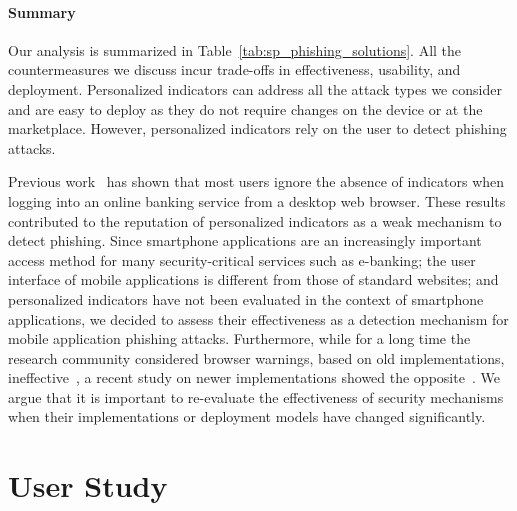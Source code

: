 \paragraph{Summary} Our analysis is summarized in Table~\ref{tab:sp_phishing_solutions}.
All the countermeasures we discuss incur trade-offs in effectiveness,
usability, and deployment. Personalized indicators can address all the attack
types we consider and are easy to deploy as they do not require changes on the
device or at the marketplace. However, personalized indicators rely on the
user to detect phishing attacks.

Previous work~\cite{schechter07sp,lee-w2sp14} has shown that most users ignore
the absence of indicators when logging into an online banking service from a
desktop web browser. These results contributed to the reputation of
personalized indicators as a weak mechanism to detect phishing. Since
smartphone applications are an increasingly important access method for many
security-critical services such as e-banking; the user interface of mobile
applications is different from those of standard websites; and personalized
indicators have not been evaluated in the context of smartphone applications,
we decided to assess their effectiveness as a detection mechanism for mobile
application phishing attacks. Furthermore, while for a long time the research
community considered browser warnings, based on old implementations,
ineffective~\cite{dhamija06chi,egelman2008chi,sunshine-usenix09}, a recent study
on newer implementations showed the opposite~\cite{akhawe13usenix}. We argue
that it is important to re-evaluate the effectiveness of security mechanisms
when their implementations or deployment models have changed significantly.


\section{User Study}
\label{sec:sp_phishing_userstudy}

